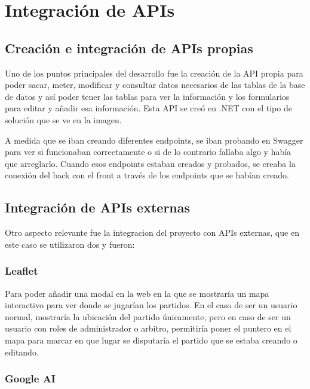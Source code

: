 \section{Integración de APIs}\label{integracion-apis}
\subsection{Creación e integración de APIs propias}

Uno de los puntos principales del desarrollo fue la creación de la API propia para poder sacar, meter, modificar y consultar datos necesarios de las tablas de la base de datos y así poder tener las tablas para ver la información y los formularios para editar y añadir esa información. Esta API se creó en .NET con el tipo de solución que se ve en la imagen.


A medida que se iban creando diferentes endpoints, se iban probando en Swagger para ver si funcionaban correctamente o si de lo contrario fallaba algo y había que arreglarlo. Cuando esos endpoints estaban creados y probados, se creaba la conexión del back con el front a través de los endpoints que se habían creado.

\subsection{Integración de APIs externas}

Otro aspecto relevante fue la integracion del proyecto con APIs externas, que en este caso se utilizaron dos y fueron:

\subsubsection{Leaflet}

Para poder añadir una modal en la web en la que se mostraría un mapa interactivo para ver donde se jugarían los partidos. En el caso de ser un usuario normal, mostraría la ubicación del partido únicamente, pero en caso de ser un usuario con roles de administrador o arbitro, permitiría poner el puntero en el mapa para marcar en que lugar se disputaría el partido que se estaba creando o editando.


\subsubsection{Google AI}

